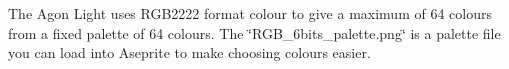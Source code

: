 The Agon Light uses RGB2222 format colour to give a maximum of 64 colours from a fixed palette of 64 colours. The \char`\"{}\+RGB\+\_\+6bits\+\_\+palette.\+png\char`\"{} is a palette file you can load into Aseprite to make choosing colours easier. 
